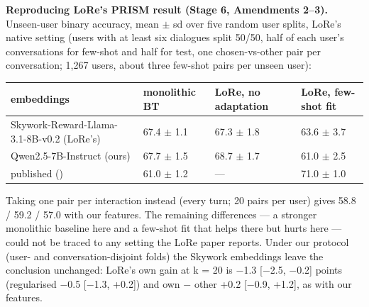 \documentclass{article}
\begin{document}
\textbf{Reproducing LoRe's PRISM result (Stage 6, Amendments 2--3).} Unseen-user binary accuracy, mean $\pm$ sd over five random user splits, LoRe's native setting (users with at least six dialogues split 50/50, half of each user's conversations for few-shot and half for test, one chosen-vs-other pair per conversation; 1,267 users, about three few-shot pairs per unseen user):

{\def\LTcaptype{none} %
\begin{table}[t]\centering\footnotesize\begin{tabular}{@{}
  l
  l
  l
  l@{}}
\toprule\noalign{}
embeddings & monolithic BT & LoRe, no adaptation & LoRe, few-shot fit \\
\midrule\noalign{}



Skywork-Reward-Llama-3.1-8B-v0.2 (LoRe's) & 67.4 $\pm$ 1.1 & 67.3 $\pm$ 1.8 & 63.6 $\pm$ 3.7 \\
Qwen2.5-7B-Instruct (ours) & 67.7 $\pm$ 1.5 & 68.7 $\pm$ 1.7 & 61.0 $\pm$ 2.5 \\
published (\citealp{bose2025lore}) & 61.0 $\pm$ 1.2 & --- & 71.0 $\pm$ 1.0 \\
\bottomrule
\end{tabular}\end{table}
}

Taking one pair per interaction instead (every turn; 20 pairs per user) gives 58.8 / 59.2 / 57.0 with our features. The remaining differences --- a stronger monolithic baseline here and a few-shot fit that helps there but hurts here --- could not be traced to any setting the LoRe paper reports. Under our protocol (user- and conversation-disjoint folds) the Skywork embeddings leave the conclusion unchanged: LoRe's own gain at k = 20 is $-$1.3 {[}$-$2.5, $-$0.2{]} points (regularised $-$0.5 {[}$-$1.3, +0.2{]}) and own $-$ other +0.2 {[}$-$0.9, +1.2{]}, as with our features.
\end{document}
